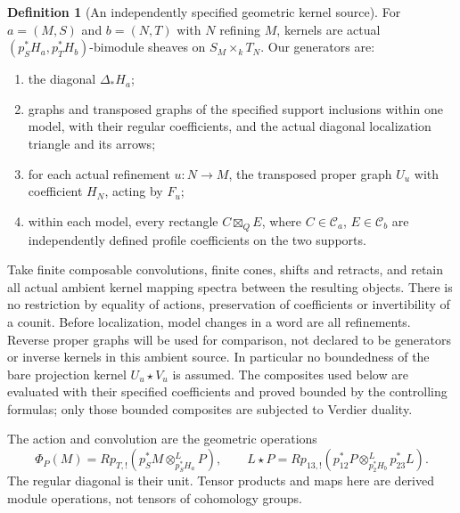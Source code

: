 \documentclass[11pt]{article}
\theoremstyle{definition}
\newtheorem{definition}[theorem]{Definition}
\theoremstyle{remark}
\begin{document}
\begin{definition}[An independently specified geometric kernel source]
\label{def:profile-kernel-source}
For $a=(M,S)$ and $b=(N,T)$ with $N$ refining $M$, kernels are actual
$(p_S^*H_a,p_T^*H_b)$-bimodule sheaves on $S_M\times_kT_N$.
Our generators are:
\begin{enumerate}
\item the diagonal $\Delta_*H_a$;
\item graphs and transposed graphs of the specified support
inclusions within one model, with their regular coefficients, and
the actual diagonal localization triangle and its arrows;
\item for each actual refinement $u:N\to M$, the transposed
proper graph $U_u$ with coefficient $H_N$, acting by $F_u$;
\item within each model, every rectangle $C\boxtimes_Q E$, where
$C\in\mathcal C_a$, $E\in\mathcal C_b$ are independently defined
profile coefficients on the two supports.
\end{enumerate}
Take finite composable convolutions, finite cones, shifts and retracts,
and retain all actual ambient kernel mapping spectra between the
resulting objects.  There is no restriction by equality of actions,
preservation of coefficients or invertibility of a counit.
Before localization, model changes in a word are all refinements.
Reverse proper graphs will be used for comparison, not declared to
be generators or inverse kernels in this ambient source.
In particular no boundedness of the bare projection kernel
$U_u\star V_u$ is assumed.  The composites used below are evaluated
with their specified coefficients and proved bounded by the controlling
formulas; only those bounded composites are subjected to Verdier duality.
\end{definition}

The action and convolution are the geometric operations
\[
 \Phi_P(M)=Rp_{T,!}(p_S^*M\otimes^L_{p_S^*H_a}P),\qquad
 L\star P=Rp_{13,!}
   (p_{12}^*P\otimes^L_{p_2^*H_b}p_{23}^*L).
\]
The regular diagonal is their unit.  Tensor products and maps here
are derived module operations, not tensors of cohomology groups.
\end{document}
